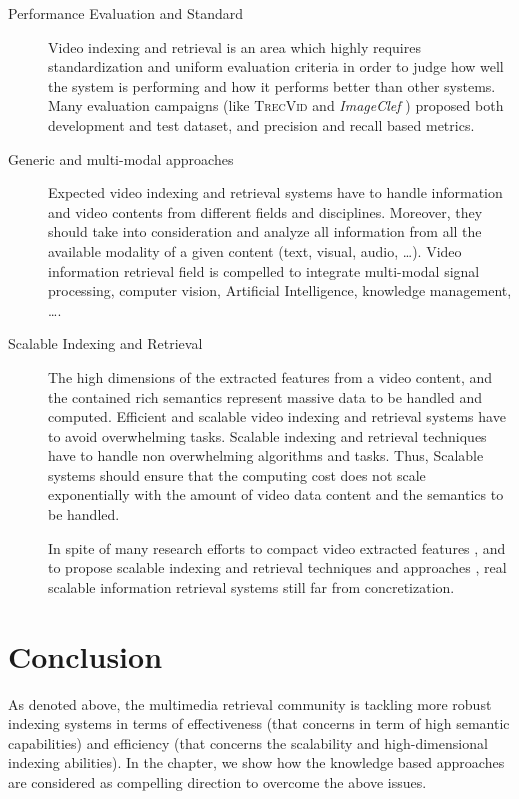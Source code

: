 \begin{description}
		\item[Performance Evaluation and Standard]
		Video indexing and retrieval is an area which highly requires standardization and uniform
		evaluation criteria in order to judge how well the system is performing and how it 
		performs better than other systems. Many evaluation campaigns (like \textsc{TrecVid} 
		\citep{Smeaton2006,Over2013,Over2014} and \textit{ImageClef} 
		\citep{Villegas2013,Villegas2014,Villegas2015}) proposed both development 
		and test dataset, and precision and recall based metrics.
		
		\item[Generic and multi-modal approaches]
		Expected video indexing and retrieval systems have to handle information and video contents 
		from different fields and disciplines. Moreover, they should take into consideration and analyze 
		all information from all the available modality of a given content (text, visual, audio, \dots{}). 
		Video information retrieval field is compelled to integrate  multi-modal signal processing, computer 
		vision,  Artificial Intelligence, knowledge management, \dots{}.

		\item[Scalable Indexing and Retrieval] 
		The high dimensions of the extracted features from a video content, and the contained rich 
		semantics represent massive data to be handled and computed. Efficient and scalable video 
		indexing and retrieval systems have to avoid overwhelming tasks. Scalable indexing and 
		retrieval techniques have to handle non overwhelming algorithms and tasks. 
		Thus, Scalable systems should ensure that the computing cost does not scale exponentially 
		with the amount of video data content and the semantics to be handled. 

		In spite of many research efforts to compact video extracted features \citep{Douze2010,
		Baroffio2013,Wang2015a,Li2015}, and to
		propose scalable indexing and retrieval techniques and approaches \citep{Caputo2014,Gilbert2015}, real scalable
		information retrieval systems still far from concretization.
	\end{description}

	\section{Conclusion}

	As denoted above, the multimedia retrieval community is tackling more robust indexing systems 
	in terms of effectiveness (that concerns in term of high semantic capabilities) and efficiency
	(that concerns the scalability and high-dimensional indexing abilities). In the chapter, 
	we show how the knowledge based approaches are considered as compelling direction to overcome
	the above issues.
